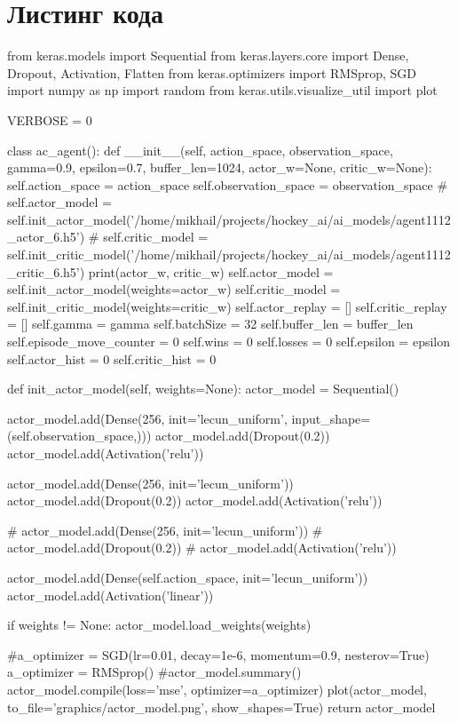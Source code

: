 \chapter{Листинг кода} \label{AppendixA}

\begin{python}
from keras.models import Sequential
from keras.layers.core import Dense, Dropout, Activation, Flatten
from keras.optimizers import RMSprop, SGD
import numpy as np
import random
from keras.utils.visualize_util import plot

VERBOSE = 0

class ac_agent():
def __init__(self, action_space, observation_space, gamma=0.9, epsilon=0.7, buffer_len=1024, actor_w=None, critic_w=None):
self.action_space = action_space
self.observation_space = observation_space
# self.actor_model = self.init_actor_model('/home/mikhail/projects/hockey_ai/ai_models/agent1112_actor_6.h5')
# self.critic_model = self.init_critic_model('/home/mikhail/projects/hockey_ai/ai_models/agent1112_critic_6.h5')
print(actor_w, critic_w)
self.actor_model = self.init_actor_model(weights=actor_w)
self.critic_model = self.init_critic_model(weights=critic_w)
self.actor_replay = []
self.critic_replay = []
self.gamma = gamma
self.batchSize = 32
self.buffer_len = buffer_len
self.episode_move_counter = 0
self.wins = 0
self.losses = 0
self.epsilon = epsilon
self.actor_hist = 0
self.critic_hist = 0

def init_actor_model(self, weights=None):
actor_model = Sequential()

actor_model.add(Dense(256, init='lecun_uniform', input_shape=(self.observation_space,)))
actor_model.add(Dropout(0.2))
actor_model.add(Activation('relu'))

actor_model.add(Dense(256, init='lecun_uniform'))
actor_model.add(Dropout(0.2))
actor_model.add(Activation('relu'))

# actor_model.add(Dense(256, init='lecun_uniform'))
# actor_model.add(Dropout(0.2))
# actor_model.add(Activation('relu'))


actor_model.add(Dense(self.action_space, init='lecun_uniform'))
actor_model.add(Activation('linear'))

if weights != None:
actor_model.load_weights(weights)

#a_optimizer = SGD(lr=0.01, decay=1e-6, momentum=0.9, nesterov=True)
a_optimizer = RMSprop()
#actor_model.summary()
actor_model.compile(loss='mse', optimizer=a_optimizer)
plot(actor_model, to_file='graphics/actor_model.png', show_shapes=True)
return actor_model


\end{python}
